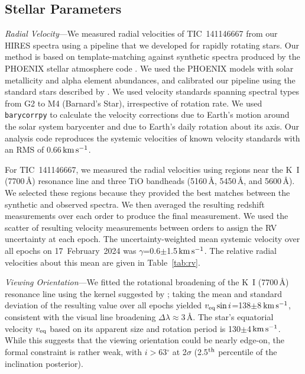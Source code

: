 \documentclass{nature3}
\newcommand{\kms}{\ensuremath{\rm km\,s^{-1}}}
\begin{document}
\begin{methods}
\subsection{Stellar Parameters}\phantom{+}
\label{subsec:stparams}

{\it Radial Velocity}---We measured radial velocities of TIC~141146667
from our HIRES spectra using a pipeline that we developed for
rapidly rotating stars.  Our method is based on template-matching
against synthetic spectra produced by the PHOENIX stellar atmosphere
code \cite{Husser2013}.  We used the PHOENIX models with solar
metallicity and alpha element abundances, and calibrated our pipeline
using the standard stars described by \cite{Chubak2012}.  We used
velocity standards spanning spectral types from G2 to M4 (Barnard's
Star), irrespective of rotation rate.  We used \texttt{barycorrpy}
\cite{Kanodia2018} to calculate the velocity corrections due to Earth's
motion around the solar system barycenter and due to Earth's daily
rotation about its axis.  Our analysis code reproduces the systemic
velocities of known velocity standards \cite{Chubak2012} with an RMS of
0.66\,\kms.

For TIC~141146667, we measured the radial velocities using regions near
the K~I (7700\,\AA) resonance line and three TiO bandheads (5160\,\AA,
5450\,\AA, and 5600\,\AA).  We selected these regions because they
provided the best matches between the synthetic and observed spectra.
We then averaged the resulting redshift measurements over each order to
produce the final measurement.  We used the scatter of resulting
velocity measurements between orders to assign the RV uncertainty at
each epoch.  The uncertainty-weighted mean systemic velocity over all
epochs on 17~February~2024 was $\gamma$=0.6$\pm$1.5\,\kms.  The
relative radial velocities about this mean are given in
Table~\ref{tab:rv}.

{\it Viewing Orientation}---We fitted the rotational broadening of the
K~I (7700\,\AA) resonance line using the kernel suggested by
\cite{Gray2008}; taking the mean and standard deviation of the resulting
value over all epochs yielded $v_{\rm eq} \sin i$=138$\pm$8\,\kms,
consistent with the visual line broadening $\Delta
\lambda$$\approx$3\,\AA.  The star's equatorial velocity $v_{\rm eq}$
based on its apparent size and rotation period is 130$\pm$4\,\kms.
While this suggests that the viewing orientation could be nearly
edge-on, the formal constraint is rather weak, with $i$$>$63$^\circ$ at
2$\sigma$ (2.5$^{\rm th}$ percentile of the inclination posterior).


\end{methods}
\end{document}
